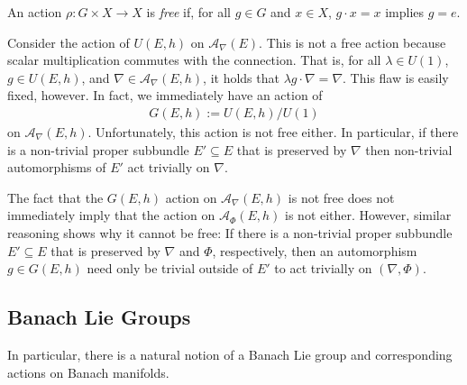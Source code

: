 \documentclass[12pt]{ociamthesis}  %
\begin{document}
\begin{definition}
  An action $\rho : G\times X\to X$ is \emph{free} if, for all
  $g\in G$ and $x\in X$, $g\cdot x = x$ implies $g = e$.
\end{definition}

\begin{example}\label{ex:not_free}
  Consider the action of $U(E,h)$ on $\mathcal A_\nabla(E)$. This is not a free action
  because scalar multiplication commutes with the connection. That is,
  for all $\lambda\in U(1)$, $g\in U(E,h)$, and $\nabla\in \mathcal A_\nabla(E,h)$,
  it holds that $\lambda g\cdot \nabla = \nabla$. This flaw is easily fixed,
  however. In fact, we immediately have an action of
  \begin{align*}
    G(E,h) := U(E,h) / U(1)
  \end{align*}
  on $\mathcal A_\nabla(E,h)$. Unfortunately, this action is not free either. In particular,
  if there is a non-trivial proper subbundle $E'\subseteq E$ that is preserved
  by $\nabla$ then non-trivial automorphisms of $E'$ act trivially on $\nabla$.
\end{example}

\begin{example}\label{ex:not_free_double}
  The fact that the $G(E,h)$ action on $\mathcal A_\nabla(E,h)$ is not free does not
  immediately imply that the action on $\mathcal A_\Phi(E,h)$ is not either. However,
  similar reasoning shows why it cannot be free: If there is a non-trivial
  proper subbundle $E'\subseteq E$ that is preserved by $\nabla$ and $\Phi$,
  respectively, then an automorphism $g\in G(E,h)$ need only be trivial
  outside of $E'$ to act trivially on $(\nabla,\Phi)$.
\end{example}


\subsection{Banach Lie Groups}

In particular, there is a natural notion of a Banach Lie group and
corresponding actions on Banach manifolds.
\end{document}
